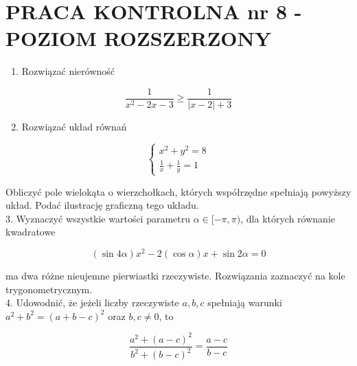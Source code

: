 \documentclass[10pt]{article}
\begin{document}
\section*{PRACA KONTROLNA nr 8 - POZIOM ROZSZERZONY}
\begin{enumerate}
  \item Rozwiązać nierówność
\end{enumerate}

$$
\frac{1}{x^{2}-2 x-3} \geqslant \frac{1}{|x-2|+3}
$$

\begin{enumerate}
  \setcounter{enumi}{1}
  \item Rozwiązać układ równań
\end{enumerate}

$$
\left\{\begin{array}{l}
x^{2}+y^{2}=8 \\
\frac{1}{x}+\frac{1}{y}=1
\end{array}\right.
$$

Obliczyć pole wielokąta o wierzchołkach, których współrzędne spełniają powyższy układ. Podać ilustrację graficzną tego układu.\\
3. Wyznaczyć wszystkie wartości parametru $\alpha \in[-\pi, \pi)$, dla których równanie kwadratowe

$$
(\sin 4 \alpha) x^{2}-2(\cos \alpha) x+\sin 2 \alpha=0
$$

ma dwa różne nieujemne pierwiastki rzeczywiste. Rozwiązania zaznaczyć na kole trygonometrycznym.\\
4. Udowodnić, że jeżeli liczby rzeczywiste $a, b, c$ spełniają warunki $a^{2}+b^{2}=(a+b-c)^{2}$ oraz $b, c \neq 0$, to

$$
\frac{a^{2}+(a-c)^{2}}{b^{2}+(b-c)^{2}}=\frac{a-c}{b-c}
$$
\end{document}
